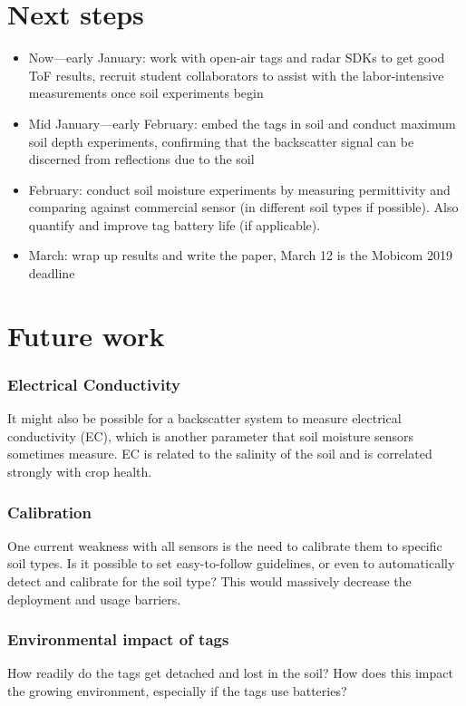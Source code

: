 \documentclass[12pt]{article}
\begin{document}
\section*{Next steps}
\begin{itemize}
\item Now---early January: work with open-air tags and radar SDKs to get
  good ToF results, recruit student collaborators to assist with the
  labor-intensive measurements once soil experiments begin
\item Mid January---early February: embed the tags in soil and conduct
  maximum soil depth experiments, confirming that the backscatter
  signal can be discerned from reflections due to the soil
\item February: conduct soil moisture experiments by measuring
  permittivity and comparing against commercial sensor (in different
  soil types if possible). Also quantify and improve tag battery life
  (if applicable).
\item March: wrap up results and write the paper, March 12 is the
  Mobicom 2019 deadline
\end{itemize}

\section*{Future work}
\subsubsection*{Electrical Conductivity} It might also be possible for a
backscatter system to measure electrical conductivity (EC), which is
another parameter that soil moisture sensors sometimes measure. EC is
related to the salinity of the soil and is correlated strongly with
crop health.

\subsubsection*{Calibration} One current weakness with all sensors is the
need to calibrate them to specific soil types. Is it possible to set
easy-to-follow guidelines, or even to automatically detect and
calibrate for the soil type? This would massively decrease the
deployment and usage barriers.

\subsubsection*{Environmental impact of tags}
How readily do the tags get detached and lost in the soil? How does
this impact the growing environment, especially if the tags use
batteries?
\end{document}
